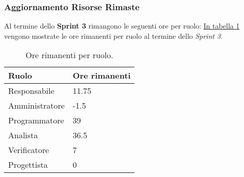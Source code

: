 \subsubsection{Aggiornamento Risorse Rimaste}
Al termine dello \textbf{Sprint 3} rimangono le seguenti ore per ruolo: \hyperref[tab:sprint3_ore_rimanenti]{In tabella \ref{tab:sprint3_ore_rimanenti}} vengono mostrate le ore rimanenti per ruolo al termine dello \textit{Sprint 3}.

\begin{table}[H]
    \centering
    \begin{tabular}{| l | l |}
    \hline
    \textbf{Ruolo} & 
    \textbf{Ore rimanenti}\\
    \hline
        Responsabile & 11.75\\
    \hline
        Amministratore & -1.5\\
    \hline
        Programmatore & 39\\
    \hline
        Analista & 36.5\\
    \hline
        Verificatore & 7\\
    \hline
        Progettista & 0\\
    \hline
    \end{tabular}
    \caption{Ore rimanenti per ruolo.}
    \label{tab:sprint3_ore_rimanenti} 
\end{table}